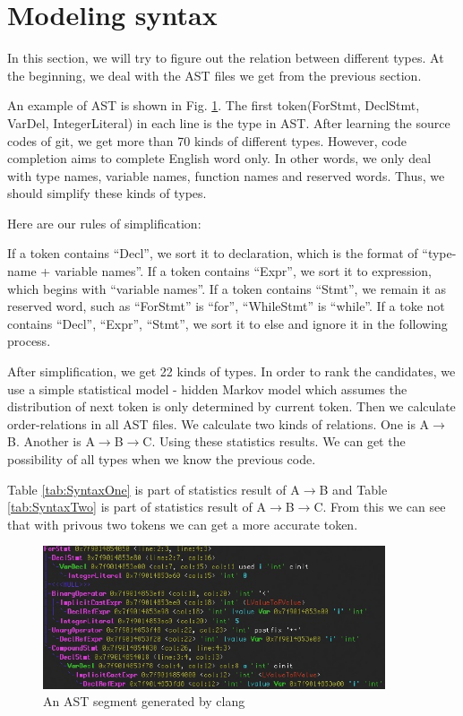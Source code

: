 \documentclass[prodmode,acmtecs]{acmsmall} %
\begin{document}
\section{Modeling syntax}
In this section, we will try to figure out the relation between different types. At the beginning, we deal with the AST files we get from the previous section. 

An example of AST is shown in Fig. \ref{fig:ast example}. The first token(ForStmt, DeclStmt, VarDel, IntegerLiteral) in each line is the type in AST. After learning the source codes of git\cite{torvalds2010git}, we get more than 70 kinds of different types. However, code completion aims to complete English word only. In other words, we only deal with type names, variable names, function names and reserved words. Thus, we should simplify these kinds of types. 

Here are our rules of simplification:

If a token contains “Decl”, we sort it to declaration, which is the format of “type-name + variable names”. If a token contains “Expr”, we sort it to expression, which begins with “variable names”. If a token contains “Stmt”, we remain it as reserved word, such as “ForStmt” is “for”, “WhileStmt” is “while”. If a toke not contains “Decl”, “Expr”, “Stmt”, we sort it to else and ignore it in the following process.

After simplification, we get 22 kinds of types. In order to rank the candidates, we use a simple statistical model - hidden Markov model which assumes the distribution of next token is only determined by current token\cite{rabiner1986introduction}. Then we calculate order-relations in all AST files. We calculate two kinds of relations. One is A$\longrightarrow$B. Another is A$\longrightarrow$B$\longrightarrow$C. Using these statistics results. We can get the possibility of all types when we know the previous code. 

Table \ref{tab:SyntaxOne} is part of statistics result of A$\longrightarrow$B and Table \ref{tab:SyntaxTwo} is part of statistics result of A$\longrightarrow$B$\longrightarrow$C. From this we can see that with privous two tokens we can get a more accurate token.


\begin{figure}
\centerline{\includegraphics[width=0.9\textwidth]{ast_example.jpg}}
\caption{An AST segment generated by clang}
\label{fig:ast example}
\end{figure}
\end{document}
